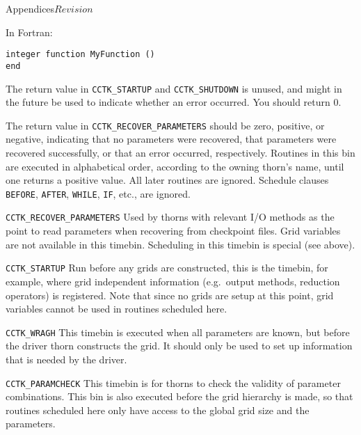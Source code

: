 \begin{cactuspart}{Appendices}{}{$Revision$}
\begin{Lentry}
\item[In Fortran:]
\begin{verbatim}
integer function MyFunction ()
end
\end{verbatim}
\end{Lentry}

The return value in {\tt CCTK\_STARTUP} and {\tt CCTK\_SHUTDOWN} is
unused, and might in the future be used to indicate whether an error
occurred.  You should return 0.

The return value in {\tt CCTK\_RECOVER\_PARAMETERS} should be zero,
positive, or negative, indicating that no parameters were recovered,
that parameters were recovered successfully, or that an error
occurred, respectively.  Routines in this bin are executed in alphabetical
order, according to the owning thorn's name, until one returns a positive
value.  All later routines are ignored.  Schedule clauses \texttt{BEFORE}, 
\texttt{AFTER}, \texttt{WHILE}, \texttt{IF}, etc., are ignored.


\begin{Lentry}

\item[{\tt CCTK\_RECOVER\_PARAMETERS}]
        Used by thorns with relevant I/O methods as the point 
        to read parameters when recovering from checkpoint files.
        Grid variables are not available in this timebin.  Scheduling
	in this timebin is special (see above).

\item[{\tt CCTK\_STARTUP}] 
        Run before any grids are constructed, this is 
        the timebin, for example, where grid independent information 
        (e.g.\ output methods, reduction operators) is registered. 
        Note that since no grids are setup at this point, grid 
        variables cannot be used in routines scheduled here.

\item[{\tt CCTK\_WRAGH}]
        This timebin is executed when all parameters are known, but
        before the driver thorn constructs the grid.  It should only
        be used to set up information that is needed by the driver.

\item[{\tt CCTK\_PARAMCHECK}] 
        This timebin is for thorns to check the validity of
        parameter combinations. This bin is also executed before the
        grid hierarchy is made, so that routines scheduled here only
        have access to the global grid size and the parameters.


\end{Lentry}
\end{cactuspart}
